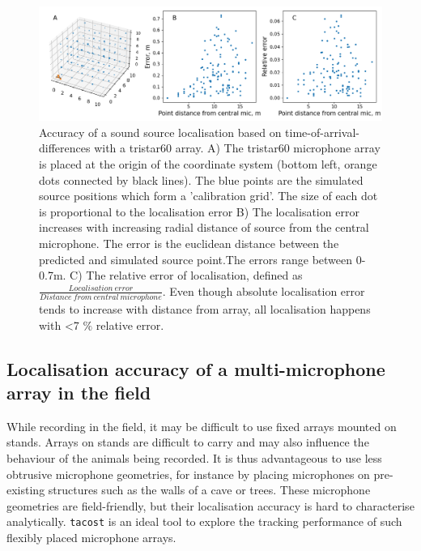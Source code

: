 \documentclass[
]{book}
\begin{document}
\begin{figure}
\includegraphics[width=1.0\columnwidth]{original_papers/tacost/data_for_figures/analysis/fig1_points_and_error.png}
\centering
\caption{Accuracy of a sound source localisation based on time-of-arrival-differences with a tristar60 array. A) The tristar60 microphone array is placed at the origin of the coordinate system (bottom left, orange dots connected by black lines). The blue points are the simulated source positions which form a 'calibration grid'. The size of each dot is proportional to the localisation error B) The localisation error increases with increasing radial distance of source from the central microphone. The error is the euclidean distance between the predicted and simulated source point.The errors range between 0-0.7m. C) The relative error of localisation, defined as $\frac{Localisation \:error}{Distance \:from \:central \:microphone}$. Even though absolute localisation error tends to increase with distance from array, all localisation happens with <7 $\%$ relative error.}
\label{tacostfig1}
\end{figure}

\hypertarget{localisation-accuracy-of-a-multi-microphone-array-in-the-field}{%
\subsection{Localisation accuracy of a multi-microphone array in the field}\label{localisation-accuracy-of-a-multi-microphone-array-in-the-field}}

While recording in the field, it may be difficult to use fixed arrays mounted on stands. Arrays on stands are difficult to carry and may also influence the behaviour of the animals being recorded. It is thus advantageous to use less obtrusive microphone geometries, for instance by placing microphones on pre-existing structures such as the walls of a cave or trees. These microphone geometries are field-friendly, but their localisation accuracy is hard to characterise analytically. \texttt{tacost} is an ideal tool to explore the tracking performance of such flexibly placed microphone arrays.
\end{document}
